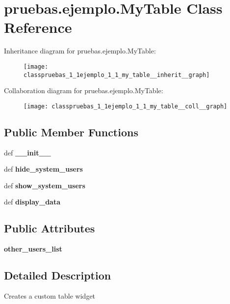 \section{pruebas.\-ejemplo.\-My\-Table \-Class \-Reference}
\label{classpruebas_1_1ejemplo_1_1_my_table}


\-Inheritance diagram for pruebas.\-ejemplo.\-My\-Table\-:\nopagebreak
\begin{figure}[H]
\begin{center}
\leavevmode
\texttt{[image: classpruebas\_1\_1ejemplo\_1\_1\_my\_table\_\_inherit\_\_graph]}
\end{center}
\end{figure}


\-Collaboration diagram for pruebas.\-ejemplo.\-My\-Table\-:\nopagebreak
\begin{figure}[H]
\begin{center}
\leavevmode
\texttt{[image: classpruebas\_1\_1ejemplo\_1\_1\_my\_table\_\_coll\_\_graph]}
\end{center}
\end{figure}
\subsection*{\-Public \-Member \-Functions}
\begin{DoxyCompactItemize}
\item 
def {\bf \-\_\-\-\_\-init\-\_\-\-\_\-}
\item 
def {\bf hide\-\_\-system\-\_\-users}
\item 
def {\bf show\-\_\-system\-\_\-users}
\item 
def {\bf display\-\_\-data}
\end{DoxyCompactItemize}
\subsection*{\-Public \-Attributes}
\begin{DoxyCompactItemize}
\item 
{\bf other\-\_\-users\-\_\-list}
\end{DoxyCompactItemize}


\subsection{\-Detailed \-Description}
\begin{DoxyVerb}Creates a custom table widget \end{DoxyVerb}
 

